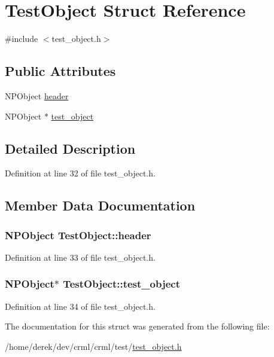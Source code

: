 \hypertarget{struct_test_object}{
\section{TestObject Struct Reference}
\label{struct_test_object}
}


{\ttfamily \#include $<$test\_\-object.h$>$}

\subsection*{Public Attributes}
\begin{DoxyCompactItemize}
\item 
NPObject \hyperlink{struct_test_object_a23d7a50afe1b29f85b5d663cbfc763b2}{header}
\item 
NPObject $\ast$ \hyperlink{struct_test_object_a286ab105369be909c3b793d53165ccc1}{test\_\-object}
\end{DoxyCompactItemize}


\subsection{Detailed Description}


Definition at line 32 of file test\_\-object.h.



\subsection{Member Data Documentation}
\hypertarget{struct_test_object_a23d7a50afe1b29f85b5d663cbfc763b2}{
\subsubsection[{header}]{\setlength{\rightskip}{0pt plus 5cm}NPObject {\bf TestObject::header}}}
\label{struct_test_object_a23d7a50afe1b29f85b5d663cbfc763b2}


Definition at line 33 of file test\_\-object.h.

\hypertarget{struct_test_object_a286ab105369be909c3b793d53165ccc1}{
\subsubsection[{test\_\-object}]{\setlength{\rightskip}{0pt plus 5cm}NPObject$\ast$ {\bf TestObject::test\_\-object}}}
\label{struct_test_object_a286ab105369be909c3b793d53165ccc1}


Definition at line 34 of file test\_\-object.h.



The documentation for this struct was generated from the following file:\begin{DoxyCompactItemize}
\item 
/home/derek/dev/crml/crml/test/\hyperlink{test__object_8h}{test\_\-object.h}\end{DoxyCompactItemize}
